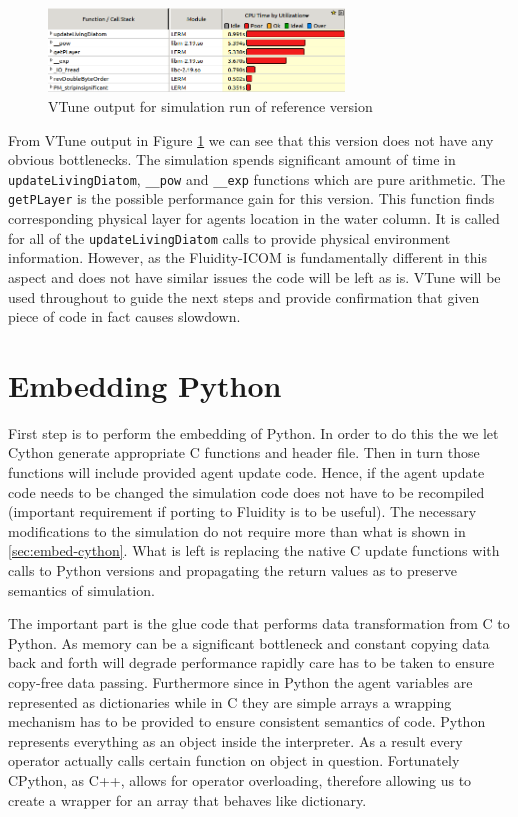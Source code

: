 \documentclass[12pt, a4paper]{report}
\begin{document}
\begin{figure}[H]
  \begin{center}
    \includegraphics[width=0.7\textwidth,natwidth=629,natheight=179]{images/vtune-master.png}
    \caption{VTune output for simulation run of reference version}
    \label{fig:vtune-master-perf}
  \end{center}
\end{figure}

From VTune output in Figure \ref{fig:vtune-master-perf} we can see that this
version does not have any obvious bottlenecks. The simulation spends significant
amount of time in \lstinline{updateLivingDiatom}, \lstinline{__pow} and
\lstinline{__exp} functions which are pure arithmetic. The \lstinline{getPLayer}
is the possible performance gain for this version. This function finds corresponding
physical layer for agents location in the water column. It is called for all of the
\lstinline{updateLivingDiatom} calls to provide physical environment information.
However, as the Fluidity-ICOM is fundamentally different in this aspect and does
not have similar issues the code will be left as is. VTune will be used throughout
to guide the next steps and provide confirmation that given piece of code in
fact causes slowdown.

\section{Embedding Python}\label{sec:embed-py}
First step is to perform the embedding of Python. In order to do this the
we let Cython generate appropriate C functions and header file.
Then in turn those functions will include provided agent update code.
Hence, if the agent update code needs to be changed the simulation
code does not have to be recompiled (important requirement if porting
to Fluidity is to be useful). The necessary modifications to the simulation
do not require more than what is shown in \ref{sec:embed-cython}. What is left
is replacing the native C update functions with calls to Python versions
and propagating the return values as to preserve semantics of simulation.

The important part is the glue code that performs data transformation from
C to Python. As memory can be a significant bottleneck and constant copying
data back and forth will degrade performance rapidly care has to be taken
to ensure copy-free data passing. Furthermore since in Python the agent
variables are represented as dictionaries while in C they are simple arrays
a wrapping mechanism has to be provided to ensure consistent semantics of
code. Python represents everything as an object inside the interpreter.
As a result every operator actually calls certain function on object in
question. Fortunately CPython, as C++, allows for operator overloading,
therefore allowing us to create a wrapper for an array that behaves
like dictionary.
\end{document}
